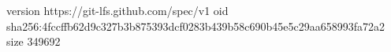 version https://git-lfs.github.com/spec/v1
oid sha256:4fccffb62d9c327b3b875393dcf0283b439b58c690b45e5c29aa658993fa72a2
size 349692
